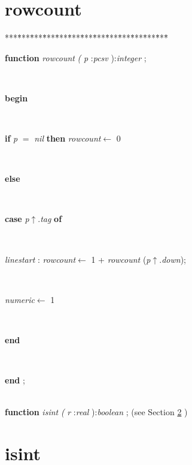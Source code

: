 \section{rowcount}\label{sec:csvfilereader/getdatamatrix/recursedown/recurse/getcolheaders/recurse/getrowheaders/recurse/colcount/getcell/removetrailingnull/onlynullsrowcount}

\begin{tabbing}
***\=***\=***\=***\=***\=***\=***\=***\=***\=***\=***\=***\=***\=\kill
\parbox{14cm}{\textsf{\textbf{function}  \textit{rowcount} \textit{(} \textit{p} :\textit{pcsv} ):\textit{integer} ;}}\\
\+\parbox{14cm}{\textsf{\textbf{begin} }}\\
\+\parbox{14cm}{\textsf {\textbf {if } \textsf{\textit{p} $=$ \textit{nil}} \textbf{ then } \textsf{\textit{rowcount}$\leftarrow$ 0}}}\\
\<\parbox{14cm}{\textsf{\textbf{else} }}\\
\+\parbox{14cm}{\textsf {\textbf {case } \textsf{\textit{p}$\uparrow$.\textit{tag}} \textbf{ of } }}\\
\parbox{14cm}{\textsf{\textit{linestart} : \textit{rowcount}$\leftarrow$ 1 + \textit{rowcount} (\textit{p}$\uparrow$.\textit{down})}; }\\
\parbox{14cm}{\textsf{\textit{numeric}$\leftarrow$ 1}}\\
\<\-\parbox{14cm}{\textsf{\textbf{end} }}\\
\<\-\<\-\parbox{14cm}{\textsf{\textbf{end} ;}}\\
\+\textsf{\textbf{function}  \textit{isint} \textit{(} \textit{r} :\textit{real} ):\textit{boolean} ;} (see Section \ref{sec:csvfilereader/getdatamatrix/recursedown/recurse/getcolheaders/recurse/getrowheaders/recurse/colcount/getcell/removetrailingnull/onlynulls/rowcountisint} )\\
\end{tabbing}
\section{isint}\label{sec:csvfilereader/getdatamatrix/recursedown/recurse/getcolheaders/recurse/getrowheaders/recurse/colcount/getcell/removetrailingnull/onlynulls/rowcountisint}

